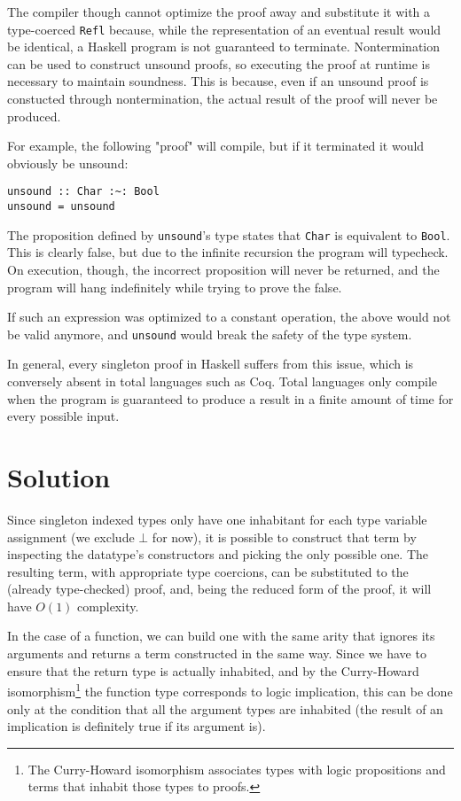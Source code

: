 The compiler though cannot optimize the proof away and substitute it with a type-coerced \texttt{Refl} because, while the representation of an eventual result would be identical, a Haskell program is not guaranteed to terminate. Nontermination can be used to construct unsound proofs, so executing the proof at runtime is necessary to maintain soundness.
This is because, even if an unsound proof is constucted through nontermination, the actual result of the proof will never be produced.

For example, the following "proof" will compile, but if it terminated it would obviously be unsound:

\begin{lstlisting}[caption=Proving the false through nontermination]
unsound :: Char :~: Bool
unsound = unsound
\end{lstlisting}

The proposition defined by \texttt{unsound}'s type states that \texttt{Char} is equivalent to \texttt{Bool}. This is clearly false, but due to the infinite recursion the program will typecheck. On execution, though, the incorrect proposition will never be returned, and the program will hang indefinitely while trying to prove the false.

If such an expression was optimized to a constant operation, the above would not be valid anymore, and \texttt{unsound} would break the safety of the type system.

In general, every singleton proof in Haskell suffers from this issue, which is conversely absent in total languages such as Coq.
Total languages only compile when the program is guaranteed to produce a result in a finite amount of time for every possible input.

\chapter{Solution}
\label{cha:solution}

Since singleton indexed types only have one inhabitant for each type variable assignment (we exclude $\bot$ for now), it is possible to construct that term by inspecting the datatype's constructors and picking the only possible one.
The resulting term, with appropriate type coercions, can be substituted to the (already type-checked) proof, and, being the reduced form of the proof, it will have $O(1)$ complexity.

In the case of a function, we can build one with the same arity that ignores its arguments and returns a term constructed in the same way.
Since we have to ensure that the return type is actually inhabited, and by the Curry-Howard isomorphism\footnote{The Curry-Howard isomorphism associates types with logic propositions and terms that inhabit those types to proofs.} the function type corresponds to logic implication, this can be done only at the condition that all the argument types are inhabited (the result of an implication is definitely true if its argument is).

